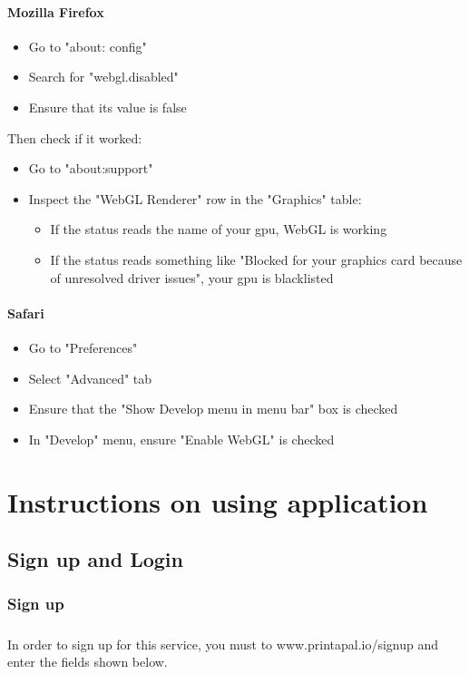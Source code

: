 \documentclass{report}
\begin{document}
\subsubsection{Mozilla Firefox}
\begin{itemize}
	\item Go to "about: config"
	\item Search for "webgl.disabled"
    \item Ensure that its value is false
\end{itemize}
Then check if it worked:
\begin{itemize}
	\item Go to "about:support"
	\item Inspect the "WebGL Renderer" row in the "Graphics" table:
    \begin{itemize}
    	\item If the status reads the name of your gpu, WebGL is working
        \item If the status reads something like "Blocked for your graphics card because of unresolved driver issues", your gpu is blacklisted
    \end{itemize}
\end{itemize}
\subsubsection{Safari}
\begin{itemize}
	\item Go to "Preferences"
    \item Select "Advanced" tab
    \item Ensure that the "Show Develop menu in menu bar" box is checked
    \item In "Develop" menu, ensure "Enable WebGL" is checked
\end{itemize}

\chapter{Instructions on using application}
\section{Sign up and Login}

\subsection*{Sign up}

\paragraph{} In order to sign up for this service, you must to www.printapal.io/signup and enter the fields shown below.
\end{document}
